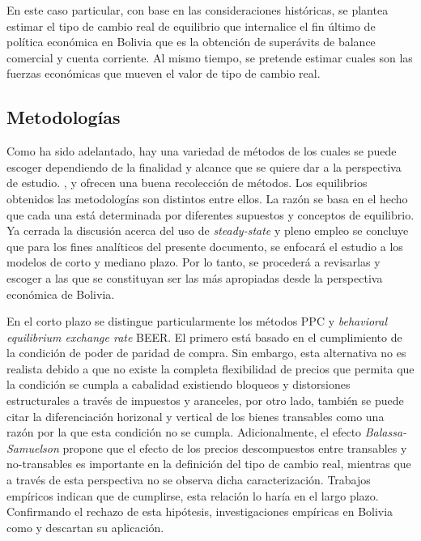 \documentclass[12pt,letterpaper]{article}
\begin{document}
En este caso particular, con base en las consideraciones históricas, se plantea estimar el tipo de cambio real de equilibrio que internalice el fin último de política económica en Bolivia que es la obtención de superávits de balance comercial y cuenta corriente. Al mismo tiempo, se pretende estimar cuales son las fuerzas económicas que mueven el valor de tipo de cambio real.

\subsection*{Metodologías}
Como ha sido adelantado, hay una variedad de métodos de los cuales se puede escoger dependiendo de la finalidad y alcance que se quiere dar a la perspectiva de estudio. \cite{driver2005concepts}, \cite{macdonald2000concepts} y \cite{akrama2003real} ofrecen una buena recolección de métodos. Los equilibrios obtenidos las metodologías son distintos entre ellos. La razón se basa en el hecho que cada una está determinada por diferentes supuestos y conceptos de equilibrio. Ya cerrada la discusión acerca del uso de \emph{steady-state} y pleno empleo se concluye que para los fines analíticos del presente documento, se enfocará el estudio a los modelos de corto y mediano plazo. Por lo tanto, se procederá a revisarlas y escoger a las que se constituyan ser las más apropiadas desde la perspectiva económica de Bolivia.

En el corto plazo se distingue particularmente los métodos PPC y \emph{behavioral equilibrium exchange rate} BEER. El primero está basado en el cumplimiento de la condición de poder de paridad de compra. Sin embargo, esta alternativa no es realista debido a que no existe la completa flexibilidad de precios que permita que la condición se cumpla a cabalidad existiendo bloqueos y distorsiones estructurales a través de impuestos y aranceles, por otro lado, también se puede citar la diferenciación horizonal y vertical de los bienes transables como una razón por la que esta condición no se cumpla. Adicionalmente, el efecto \emph{Balassa-Samuelson} propone que el efecto de los precios descompuestos entre transables y no-transables \citep{balassa1968effective} es importante en la definición del tipo de cambio real, mientras que a través de esta perspectiva no se observa dicha caracterización. Trabajos empíricos indican que de cumplirse, esta relación lo haría en el largo plazo. Confirmando el rechazo de esta hipótesis, investigaciones empíricas en Bolivia como \cite{lora2000tipo} y \cite{humerez2005reexaminando} descartan su aplicación.
\end{document}
